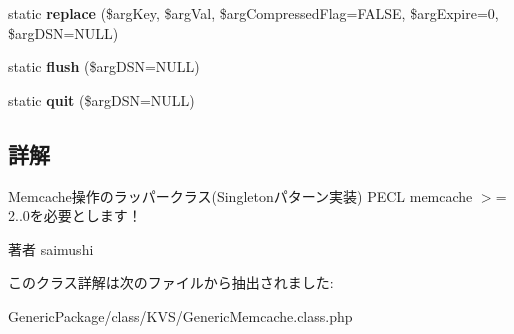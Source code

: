 \begin{DoxyCompactItemize}
\item 
\hypertarget{class_generic_memcache_a473479b2a611c2bde813daf3f2f230e1}{}static {\bfseries replace} (\$arg\+Key, \$arg\+Val, \$arg\+Compressed\+Flag=F\+A\+L\+S\+E, \$arg\+Expire=0, \$arg\+D\+S\+N=N\+U\+L\+L)\label{class_generic_memcache_a473479b2a611c2bde813daf3f2f230e1}

\item 
\hypertarget{class_generic_memcache_aee5fede2a37f656cef6e7e400676a791}{}static {\bfseries flush} (\$arg\+D\+S\+N=N\+U\+L\+L)\label{class_generic_memcache_aee5fede2a37f656cef6e7e400676a791}

\item 
\hypertarget{class_generic_memcache_ab012f8b4608a0ca2246daaed04e9c29b}{}static {\bfseries quit} (\$arg\+D\+S\+N=N\+U\+L\+L)\label{class_generic_memcache_ab012f8b4608a0ca2246daaed04e9c29b}

\end{DoxyCompactItemize}


\subsection{詳解}
Memcache操作のラッパークラス(Singletonパターン実装) P\+E\+C\+L memcache $>$= 2..\+0を必要とします！ \begin{DoxyAuthor}{著者}
saimushi 
\end{DoxyAuthor}


このクラス詳解は次のファイルから抽出されました\+:\begin{DoxyCompactItemize}
\item 
Generic\+Package/class/\+K\+V\+S/Generic\+Memcache.\+class.\+php\end{DoxyCompactItemize}
